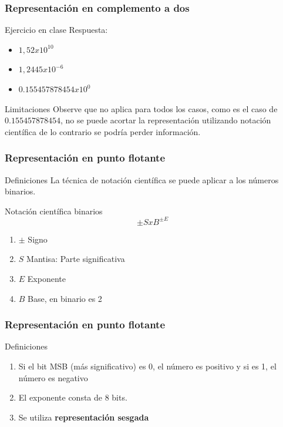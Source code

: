 \documentclass{beamer}
\begin{document}
\begin{frame}
	\frametitle{Representación en complemento a dos}
	\begin{block}{Ejercicio en clase}
	Respuesta:
		\begin{itemize}
			\item $1,52x10^{10}$
			\item $1,2445x10^{-6}$
			\item $0.155457878454x10^{0}$
		\end{itemize}
	\end{block}	
	\begin{alertblock}{Limitaciones}
	Observe que no aplica para todos los casos, como es el caso de $0.155457878454$, no se puede acortar la representación utilizando notación científica de lo contrario se podría perder información.
	\end{alertblock}
\end{frame}

\begin{frame}
	\frametitle{Representación en punto flotante}
	\begin{block}{Definiciones}
		La técnica de notación científica se puede aplicar a los números binarios.
	\end{block}	
	\begin{block}{Notación científica binarios}
	\begin{equation}
		\pm S x B^{\pm E}
	\end{equation}
	
		\begin{enumerate}
			\item $\pm$ Signo
			\item $S$ Mantisa: Parte significativa
			\item $E$ Exponente
			\item $B$ Base, en binario es 2
		\end{enumerate}

	\end{block}
\end{frame}

\begin{frame}
	\frametitle{Representación en punto flotante}
	\begin{block}{Definiciones}
		\begin{enumerate}
			\item Si el bit MSB (más significativo) es 0, el n\'umero es positivo y si es 1, el n\'umero es negativo
			\item El exponente consta de 8 bits.
			\item Se utiliza \textbf{representación sesgada}
		\end{enumerate}
	\end{block}
\end{frame}
\end{document}
